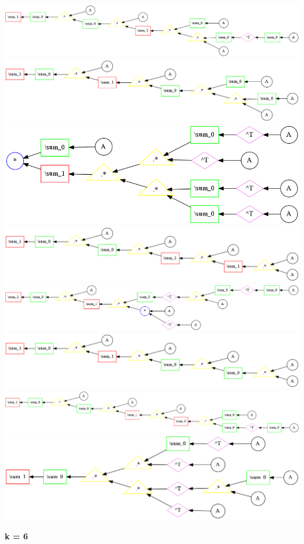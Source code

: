 \begin{center}
\includegraphics[width=0.45\linewidth]{trees/RBM_5_horizontal_22.png}
\includegraphics[width=0.45\linewidth]{trees/RBM_5_horizontal_23.png}
\includegraphics[width=0.45\linewidth]{trees/RBM_5_horizontal_24.png}
\includegraphics[width=0.45\linewidth]{trees/RBM_5_horizontal_25.png}
\includegraphics[width=0.45\linewidth]{trees/RBM_5_horizontal_26.png}
\includegraphics[width=0.45\linewidth]{trees/RBM_5_horizontal_27.png}
\includegraphics[width=0.45\linewidth]{trees/RBM_5_horizontal_28.png}
\includegraphics[width=0.45\linewidth]{trees/RBM_5_horizontal_29.png}
\end{center}


{\bf k = 6}


